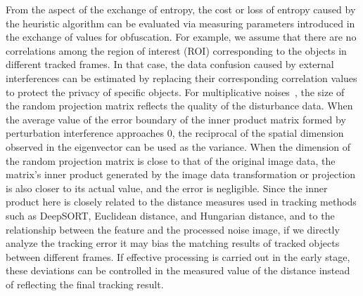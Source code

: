 \documentclass[trans]{IEEEtran}
\begin{document}
From the aspect of the exchange of entropy, the cost or loss of entropy caused by the heuristic algorithm can be evaluated via measuring parameters introduced in the exchange of values for obfuscation. For example, we assume that there are no correlations among the region of interest (ROI) corresponding to the objects in different tracked frames. In that case, the data confusion caused by external interferences can be estimated by replacing their corresponding correlation values to protect the privacy of specific objects. For multiplicative noises~\cite{liu2006random}, the size of the random projection matrix reflects the quality of the disturbance data. 
When the average value of the error boundary of the inner product matrix formed by perturbation interference approaches 0, the reciprocal of the spatial dimension observed in the eigenvector can be used as the variance. When the dimension of the random projection matrix is close to that of the original image data, the matrix's inner product generated by the image data transformation or projection is also closer to its actual value, and the error is negligible. Since the inner product here is closely related to the distance measures used in tracking methods such as DeepSORT, Euclidean distance, and Hungarian distance, and to the relationship between the feature and the processed noise image, if we directly analyze the tracking error it may bias the matching results of tracked objects between different frames. If effective processing is carried out in the early stage, these deviations can be controlled in the measured value of the distance instead of reflecting the final tracking result.

%
\end{document}
